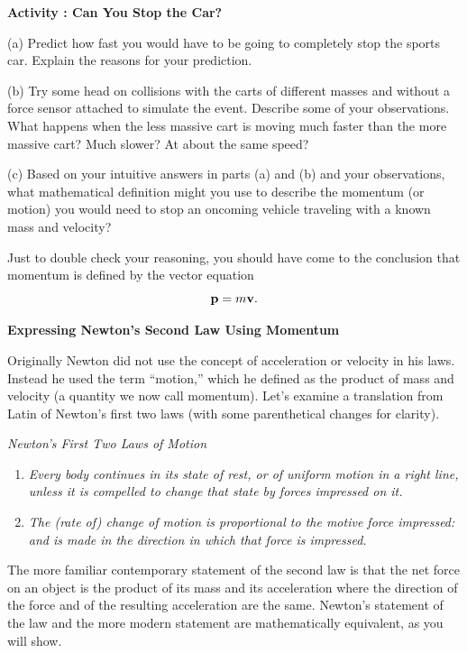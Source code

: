 \textbf{Activity : Can You Stop the Car?} 

(a) Predict how fast you would have to be going to completely stop the sports
car. Explain the reasons for your prediction.
\vspace{20mm}

(b) Try some head on collisions with the carts of different masses and without
a force sensor attached to simulate
the event. Describe some of your observations. What happens when the less massive
cart is moving much faster than the more massive cart? Much slower? At about
the same speed?
\vspace{20mm}

(c) Based on your intuitive answers in parts (a) and (b) and your observations,
what mathematical definition might you use to describe the momentum (or motion)
you would need to stop an oncoming vehicle traveling with a known mass and velocity?
\vspace{20mm}

Just to double check your reasoning, you should have come to the conclusion
that momentum is defined by the vector equation
\[
{\bf p}=m{\bf v}.\]

\newpage


\textbf{Expressing Newton's Second Law Using Momentum }

Originally Newton did not use the concept of acceleration or velocity in his
laws. Instead he used the term ``motion,'' which he defined
as the product of mass and velocity (a quantity we now call momentum). Let's
examine a translation from Latin of Newton's first two laws (with some parenthetical
changes for clarity).

\textit{Newton's First Two Laws of Motion}

\begin{enumerate}
\item \textit{Every body continues in its state of rest, or of uniform motion in a
right line, unless it is compelled to change that state by forces impressed
on it. }
\item \textit{The (rate of) change of motion is proportional to the motive force impressed:
and is made in the direction in which that force is impressed.}
\end{enumerate}
The more familiar contemporary statement of the second law is that the net force
on an object is the product of its mass and its acceleration where the direction
of the force and of the resulting acceleration are the same. Newton's statement
of the law and the more modern statement are mathematically equivalent, as you
will show.

